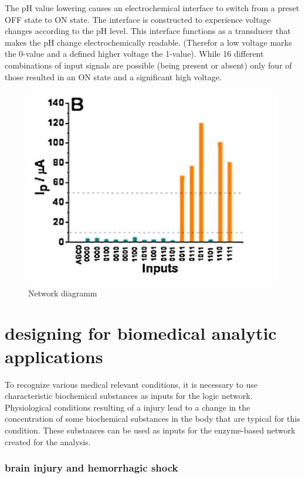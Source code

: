 \documentclass[runningheads]{llncs}
\begin{document}
	
		The pH value lowering causes an electrochemical interface to switch from a preset OFF state to ON state. The interface is constructed to experience voltage changes according to the pH level. This interface functions as a transducer that makes the pH change electrochemically readable. (Therefor a low voltage marks the 0-value and a defined higher voltage the 1-value). While 16 different combinations of input signals are possible (being present or absent) only four of those resulted in an ON state and a significant high voltage.
		\begin{figure}[H] \centering \includegraphics[scale= 0.4]{pics/ph.png} \caption{Network diagramm} \label{img:ph} \end{figure}
	
	



\section{designing for biomedical analytic applications}
	To recognize various medical relevant conditions, it is necessary to use characteristic biochemical substances as inputs for the logic network.
	Physiological conditions resulting of a injury lead to a change in the concentration of some biochemical substances in the body that are typical for this condition. These substances can be used as inputs for the enzyme-based network created for the analysis.
	
	
	\subsubsection{brain injury and hemorrhagic shock}
	
\end{document}
